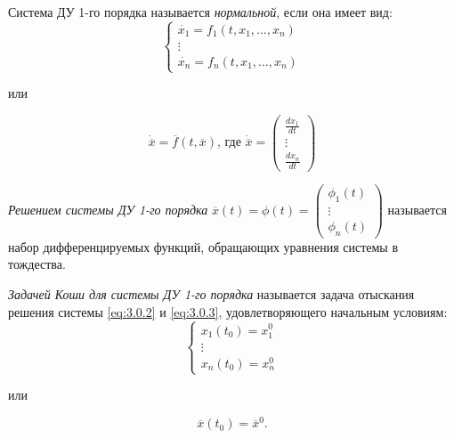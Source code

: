 \begin{definition}
    Система ДУ 1-го порядка называется \emph{нормальной}, если она имеет вид:
    \begin{equation}\label{eq:3.0.2}
        \left\{\begin{array}{l}
            \dot{x_1} = f_1(t,x_1,\ldots,x_n) \\
            \vdots                            \\
            \dot{x_n} = f_n(t,x_1,\ldots,x_n)
        \end{array}\right.
    \end{equation}
    \begin{center}
        или
    \end{center}
    \begin{equation}\label{eq:3.0.3}
        \dot{\overline{x}} = \overline{f}(t,\overline{x})\text{, где }\dot{\overline{x}} = \left(\begin{matrix}
                \frac{dx_1}{dt} \\ \vdots \\ \frac{dx_n}{dt}
            \end{matrix}\right)
    \end{equation}
\end{definition}

\begin{definition}
    \emph{Решением системы ДУ 1-го порядка} $ \overline{x}(t) = \phi(t) = \left(\begin{matrix}
                \phi_1(t) \\ \vdots \\ \phi_n(t)
            \end{matrix}\right) $ называется набор дифференцируемых функций, обращающих уравнения системы в тождества.
\end{definition}

\begin{definition}
    \emph{Задачей Коши для системы ДУ 1-го порядка} называется задача отыскания решения системы \ref{eq:3.0.2} и \ref{eq:3.0.3}, удовлетворяющего начальным условиям:
    \begin{equation}\label{eq:3.0.4}
        \left\{\begin{array}{l}
            x_1(t_0) = x_1^0 \\
            \vdots           \\
            x_n(t_0) = x_n^0
        \end{array}\right.
    \end{equation}
    \begin{center}
        или
    \end{center}
    \begin{equation}\label{eq:3.0.5}
        \overline{x}(t_0)=\overline{x}^0.
    \end{equation}
\end{definition}

